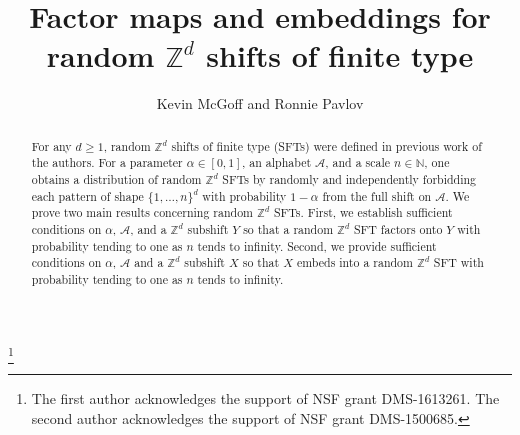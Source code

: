 \documentclass[12pt]{amsart}
\title[Factors and embeddings for random $\mathbb{Z}^d$ SFTs]{Factor maps and embeddings for random $\mathbb{Z}^d$ shifts of finite type}
\theoremstyle{definition}
\begin{document}
\author{Kevin McGoff and Ronnie Pavlov}
\address{Kevin McGoff\\
Department of Mathematics\\
University of North Carolina at Charlotte\\
Charlotte, NC 28223}
\address{Ronnie Pavlov\\
Department of Mathematics\\
University of Denver\\
2280 S. Vine St.\\
Denver, CO 80208}
\thanks{The first author acknowledges the support of NSF grant DMS-1613261. The second author acknowledges the support of NSF grant DMS-1500685.}

\renewcommand{\subjclassname}{MSC 2010}

\begin{abstract}
For any $d \geq 1$, random $\mathbb{Z}^d$ shifts of finite type (SFTs) were defined in previous work of the authors. For a parameter $\alpha \in [0,1]$, an alphabet $\mathcal{A}$, and a scale $n \in \mathbb{N}$, one obtains a distribution of random $\mathbb{Z}^d$ SFTs by randomly and independently forbidding each pattern of shape $\{1,\dots,n\}^d$ with probability $1-\alpha$ from the full shift on $\mathcal{A}$. We prove two main results concerning random $\mathbb{Z}^d$ SFTs. First, we establish sufficient conditions on $\alpha$, $\mathcal{A}$, and a $\mathbb{Z}^d$ subshift $Y$ so that a random $\mathbb{Z}^d$ SFT factors onto $Y$ with probability tending to one as $n$ tends to infinity.  Second, we provide sufficient conditions on $\alpha$, $\mathcal{A}$ and a $\mathbb{Z}^d$ subshift $X$ so that $X$ embeds into a random $\mathbb{Z}^d$ SFT with probability tending to one as $n$ tends to infinity. 
\end{abstract}
\end{document}

